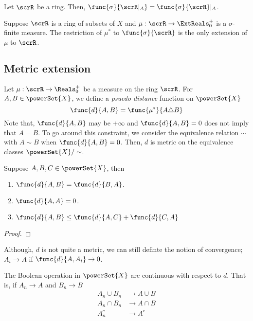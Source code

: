 \begin{proposition}
    Let \(\scrR\) be a ring. Then, \(\func{\sigma}{\scrR|_A} =\func{\sigma}{\scrR}|_A \).
\end{proposition}

\begin{theorem}
    Suppose \(\scrR\) is a ring of subsets of \(X\) and \(\mu: \scrR \to \ExtReals^+_0\) is a \(\sigma\)-finite measure. The restriction of \(\mu^{\ast}\) to \(\func{\sigma}{\scrR}\) is the only extension of \(\mu\) to \(\scrR\).
\end{theorem}

\subsection{Metric extension}
Let \(\mu:\scrR \to \Reals^+_0\) be a measure on the ring \(\scrR\). For \(A,B \in \powerSet{X}\), we define a \textit{psuedo distance} function on \(\powerSet{X}\)
\begin{equation*}
    \func{d}{A,B} = \func{\mu^{\ast}}{A \triangle B}
\end{equation*}
Note that, \(\func{d}{A,B}\) may be \(+ \infty\) and \(\func{d}{A,B} = 0\) does not imply that \(A = B\). To go around this constraint, we consider the equivalence relation \(\sim\) with \(A \sim B\) when \(\func{d}{A,B} = 0\). Then, \(d\) is metric on the equivalence classes \(\powerSet{X}/\sim\).
\begin{proposition}
    Suppose \(A,B,C \in \powerSet{X}\), then 
    \begin{enumerate}
        \item \(\func{d}{A,B} = \func{d}{B,A}\).
        \item \(\func{d}{A,A} = 0\).
        \item \(\func{d}{A,B} \leq \func{d}{A,C} + \func{d}{C,A}\)
    \end{enumerate}
\end{proposition}
\begin{proof}
    
\end{proof}

Although, \(d\) is not quite a metric, we can still definte the notion of convergence; \(A_i \to A\) if \(\func{d}{A,A_i} \to 0\).

\begin{proposition}
    The Boolean operation in \(\powerSet{X}\) are continuous with respect to \(d\). That is, if \(A_n \to A\) and \(B_n \to B\)
    \begin{align*}
        A_n \cup B_n &\to A \cup B\\
        A_n \cap B_n &\to A \cap B\\
        A_n^c &\to A^c
    \end{align*}
\end{proposition}

